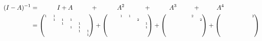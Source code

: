 \documentclass[sigplan,acmsmall,nonacm,screen]{acmart}\settopmatter{printfolios=false,printccs=false,printacmref=false}
\begin{document}
\begin{align}
(I-A)^{-1} &= \hspace{1cm}I + A \hspace{1cm}+\hspace{1.05cm} A^2 \hspace{1.07cm}+\hspace{1cm} A^3 \hspace{0.9cm}+\hspace{0.9cm} A^4\\
  &=\begin{tiny}\begin{pmatrix}
      1 & 1 &   &   &   &   \\
        & 1 & 1 & 1 &   &   \\
        &   & 1 &   & 1 &   \\
        &   &   & 1 & 1 &   \\
        &   &   &   & 1 & 1 \\
        &   &   &   &   & 1  \\
  \end{pmatrix} + \begin{pmatrix}
        &   & 1 & 1 &   &   \\
        &   &   &   & 2 &   \\
        &   &   &   &   & 1 \\
        &   &   &   &   & 1 \\
        &   &   &   &   &   \\
        &   &   &   &   &   \\
  \end{pmatrix} + \begin{pmatrix}
        &   &   &   & 2 &   \\
        &   &   &   &   & 2 \\
        &   &   &   &   &   \\
        &   &   &   &   &   \\
        &   &   &   &   &   \\
        &   &   &   &   &   \\
  \end{pmatrix} + \begin{pmatrix}
        &   &   &   &   & 2 \\
        &   &   &   &   &   \\
        &   &   &   &   &   \\
        &   &   &   &   &   \\
        &   &   &   &   &   \\
        &   &   &   &   &   \\

\end{pmatrix}
\end{tiny}
\end{align}
\end{document}

